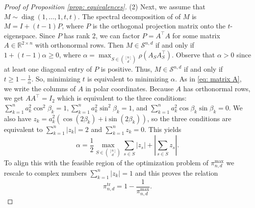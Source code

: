 \documentclass[10pt,a4paper]{amsart}
\def\RR{\mathbb{R}}
\def\S{\mathcal{S}}
\def\diag{\operatorname{diag}}
\def\tr{\operatorname{tr}}
\begin{document}
\begin{proof}[Proof of Proposition \ref{prop: equivalences}]
(2) Next, we assume that $M \sim \diag(1,\ldots,1,t,t)$. The spectral decomposition of of $M$ is $M=I+(t-1)P$, where $P$ is the orthogonal projection matrix onto the $t$-eigenspace. Since $P$ has rank 2, we can factor $P=A^\top A$ for some matrix $A \in \RR^{2 \times n}$ with orthonormal rows. Then $M \in \S^{n,d}$ if and only if  $1+(t-1)\alpha \geq 0$, where $\alpha = \max_{S \in \binom{[n]}{d}}\rho(A_SA_S^\top)$. Observe that $\alpha > 0$ since at least one diagonal entry of $P$ is positive. Thus, $M \in \S^{n,d}$ if and only if $t \geq 1- \frac{1}{\alpha}$. So, minimizing $t$ is equivalent to minimizing $\alpha$. 
    As in \eqref{eq: matrix A}, we write the columns of $A$ in polar coordinates. Because $A$ has orthonormal rows, we get $AA^\top = I_2$ which is equivalent to the three conditions: $\sum_{k=1}^n a_k^2 \cos^2 \beta_k = 1, \sum_{k=1}^n a_k^2 \sin^2 \beta_k =1$, and $\sum_{k=1}^n a_k^2 \cos\beta_k \sin \beta_k = 0$. We also have $z_k = a_k^2(\cos (2\beta_k) + \mathrm{i} \sin (2\beta_k))$, so 
    the three conditions are equivalent to $\sum_{k=1}^n |z_k| =2$ and $\sum_{k=1}^n z_k = 0$. This yields
    \[ \alpha = \frac{1}{2}\max_{S\in\binom{[n]}d} \sum_{s\in S}|z_s|+\left|\sum_{s\in S} z_s\right|. \] To align this with the feasible region of the optimization problem of $\pi_{n,d}^{\max}$ we rescale to complex numbers $\sum_{k=1}^n |z_k|=1$ and this proves the relation
    \[ \pi_{n,d}^{\tr} = 1- \frac{1}{\pi_{n,d}^{\max}}.\]

\end{proof}
\end{document}
